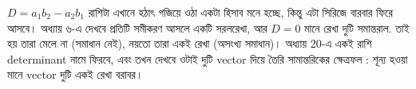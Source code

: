 \documentclass[11pt]{article}
\begin{document}
\begin{remark}
$D = a_1b_2 - a_2b_1$ রাশিটা এখানে হঠাৎ গজিয়ে ওঠা একটা হিসাব মনে হচ্ছে, কিন্তু
এটা সিরিজে বারবার ফিরে আসবে। অধ্যায় ৬-এ দেখবে প্রতিটি সমীকরণ আসলে একটি
সরলরেখা, আর $D = 0$ মানে রেখা দুটি সমান্তরাল. তাই হয় তারা মেলে না (সমাধান
নেই), নয়তো তারা একই রেখা (অসংখ্য সমাধান)। অধ্যায় 20-এ একই রাশি determinant
নামে ফিরবে, এবং তখন দেখবে ওটাই দুটি vector দিয়ে তৈরি সামান্তরিকের ক্ষেত্রফল :
শূন্য হওয়া মানে vector দুটি একই রেখা বরাবর।
\end{remark}
\end{document}
